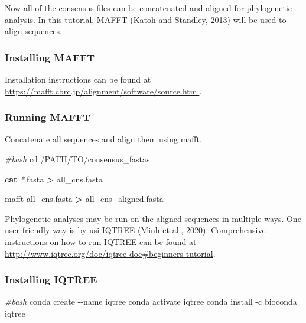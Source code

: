 \documentclass[
  12pt,
]{article}
\newenvironment{Shaded}{\begin{snugshade}}{\end{snugshade}}
\newcommand{\AttributeTok}[1]{\textcolor[rgb]{0.13,0.29,0.53}{#1}}
\newcommand{\BuiltInTok}[1]{#1}
\newcommand{\CommentTok}[1]{\textcolor[rgb]{0.56,0.35,0.01}{\textit{#1}}}
\newcommand{\ExtensionTok}[1]{#1}
\newcommand{\FunctionTok}[1]{\textcolor[rgb]{0.13,0.29,0.53}{\textbf{#1}}}
\newcommand{\NormalTok}[1]{#1}
\newcommand{\OperatorTok}[1]{\textcolor[rgb]{0.81,0.36,0.00}{\textbf{#1}}}
\newcommand{\PreprocessorTok}[1]{\textcolor[rgb]{0.56,0.35,0.01}{\textit{#1}}}
\begin{document}
Now all of the consensus files can be concatenated and aligned for phylogenetic analysis. In this tutorial, MAFFT (\protect\hyperlink{ref-Katoh2013}{Katoh and Standley, 2013}) will be used to align sequences.

\hypertarget{installing-mafft}{%
\subsubsection{Installing MAFFT}\label{installing-mafft}}

Installation instructions can be found at \url{https://mafft.cbrc.jp/alignment/software/source.html}.

\hypertarget{running-mafft}{%
\subsubsection{Running MAFFT}\label{running-mafft}}

Concatenate all sequences and align them using mafft.

\begin{Shaded}
\begin{Highlighting}[]
\CommentTok{\#bash}
\BuiltInTok{cd}\NormalTok{ /PATH/TO/consensus\_fastas}

\FunctionTok{cat} \PreprocessorTok{*}\NormalTok{.fasta }\OperatorTok{\textgreater{}}\NormalTok{ all\_cns.fasta}

\ExtensionTok{mafft}\NormalTok{ all\_cns.fasta }\OperatorTok{\textgreater{}}\NormalTok{ all\_cns\_aligned.fasta}
\end{Highlighting}
\end{Shaded}

Phylogenetic analyses may be run on the aligned sequences in multiple ways. One user-friendly way is by usi IQTREE (\protect\hyperlink{ref-Minh2020}{Minh et al., 2020}). Comprehensive instructions on how to run IQTREE can be found at \url{http://www.iqtree.org/doc/iqtree-doc\#beginners-tutorial}.

\hypertarget{installing-iqtree}{%
\subsubsection{Installing IQTREE}\label{installing-iqtree}}

\begin{Shaded}
\begin{Highlighting}[]
\CommentTok{\#bash}
\ExtensionTok{conda}\NormalTok{ create }\AttributeTok{{-}{-}name}\NormalTok{ iqtree}
\ExtensionTok{conda}\NormalTok{ activate iqtree}
\ExtensionTok{conda}\NormalTok{ install }\AttributeTok{{-}c}\NormalTok{ bioconda iqtree}
\end{Highlighting}
\end{Shaded}
\end{document}
